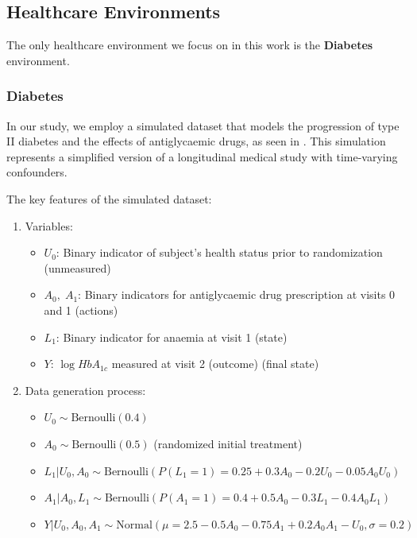 \subsection{Healthcare Environments}

The only healthcare environment we focus on in this work is
the \textbf{Diabetes} environment.

\subsubsection{Diabetes}

In our study, we employ a simulated dataset that models
the progression of type II diabetes and the effects of antiglycaemic drugs,
as seen in \cite{sim2012}.
This simulation represents a simplified version of a longitudinal
medical study with time-varying confounders.

The key features of the simulated dataset:
\begin{enumerate}
    \item Variables:
    \begin{itemize}
        \item $U_0$: Binary indicator of subject's health status
        prior to randomization (unmeasured)
        \item $A_0,\; A_1$: Binary indicators for antiglycaemic
        drug prescription at visits 0 and 1 (actions)
        \item $L_1$: Binary indicator for anaemia at visit 1 (state)
        \item $Y$: $\log HbA_{1c}$ measured at visit 2 (outcome) (final state)
    \end{itemize}

    \item Data generation process:
    \begin{itemize}
        \item $U_0 \sim \text{Bernoulli}(0.4)$
        \item $A_0 \sim \text{Bernoulli}(0.5)$ (randomized initial treatment)
        \item $L_1 | U_0, A_0 \sim \text{Bernoulli}(P(L_1 = 1) = 0.25 + 0.3A_0 - 0.2U_0 - 0.05A_0U_0)$
        \item $A_1 | A_0, L_1 \sim \text{Bernoulli}(P(A_1 = 1) = 0.4 + 0.5A_0 - 0.3L_1 - 0.4A_0L_1)$
        \item $Y | U_0, A_0, A_1 \sim \text{Normal}(\mu = 2.5 - 0.5A_0 - 0.75A_1 + 0.2A_0A_1 - U_0, \sigma = 0.2)$
    \end{itemize}
\end{enumerate}

